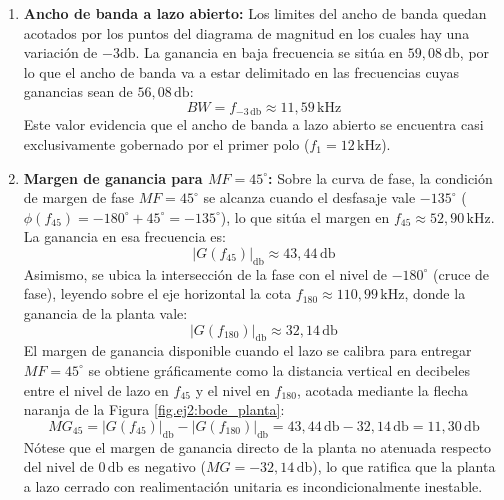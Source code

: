 \begin{enumerate}
    \item \textbf{Ancho de banda a lazo abierto:} Los limites del ancho de banda quedan acotados por los puntos del
        diagrama de magnitud en los cuales hay una variación de $-3 \si{\decibel}$. La ganancia en baja frecuencia se
        sitúa en $59,08\,\si{\decibel}$, por lo que el ancho de banda va a estar delimitado en las frecuencias cuyas
        ganancias sean de $56,08\,\si{\decibel}$:
        \begin{equation}
            BW = f_{-3\,\si{\decibel}} \approx 11,59\,\si{\kilo\hertz}
        \end{equation}
        Este valor evidencia que el ancho de banda a lazo abierto se encuentra casi exclusivamente gobernado por el
        primer polo ($f_1 = 12\,\si{\kilo\hertz}$).
    \item \textbf{Margen de ganancia para $MF = 45^\circ$:} Sobre la curva de fase, la condición de margen de
    fase $MF = 45^\circ$ se alcanza cuando el desfasaje vale $-135^\circ$ ($\phi(f_{45}) = -180^\circ + 45^\circ = -135^\circ$),
    lo que sitúa el margen en $f_{45} \approx 52,90\,\si{\kilo\hertz}$. La ganancia en esa frecuencia es: 
    \begin{equation}
        |G(f_{45})|_{\si{\decibel}} \approx 43,44\,\si{\decibel}
    \end{equation}
    Asimismo, se ubica la intersección de la fase con el nivel de $-180^\circ$ (cruce de fase), leyendo sobre el eje horizontal
    la cota $f_{180} \approx 110,99\,\si{\kilo\hertz}$, donde la ganancia de la planta vale:
    \begin{equation}
        |G(f_{180})|_{\si{\decibel}} \approx 32,14\,\si{\decibel}
    \end{equation}
    El margen de ganancia disponible cuando el lazo se calibra para entregar $MF = 45^\circ$ se obtiene gráficamente como la
    distancia vertical en decibeles entre el nivel de lazo en $f_{45}$ y el nivel en $f_{180}$, acotada mediante la flecha
    naranja de la Figura \ref{fig.ej2:bode_planta}:
    \begin{equation}
        MG_{45} = |G(f_{45})|_{\si{\decibel}} - |G(f_{180})|_{\si{\decibel}} = 43,44\,\si{\decibel} - 32,14\,\si{\decibel} = 11,30\,\si{\decibel}
    \end{equation}
    Nótese que el margen de ganancia directo de la planta no atenuada respecto del nivel de $0\,\si{\decibel}$ es negativo
    ($MG = -32,14\,\si{\decibel}$), lo que ratifica que la planta a lazo cerrado con realimentación unitaria es incondicionalmente
    inestable.
\end{enumerate}

